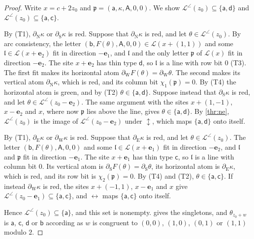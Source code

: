 \begin{proof}
Write $x=c+2z_0$ and $\mathfrak p=(\mathsf a,\kappa,\mathsf A,0,0)$. We show $\mathcal L^{\angle}(z_0)\subseteq\{\mathsf a,\mathsf d\}$ and $\mathcal L^{\angle}(z_0)\subseteq\{\mathsf a,\mathsf c\}$.

By (T1), $\partial_{\mathrm N}\kappa$ or $\partial_{\mathrm S}\kappa$ is red. Suppose that $\partial_{\mathrm N}\kappa$ is red, and let $\theta\in\mathcal L^{\angle}(z_0)$. By arc consistency, the letter $(\mathsf b,F(\theta),\mathsf A,0,0)\in\mathcal L(x+(1,1))$ and some $\mathfrak l\in\mathcal L(x+\mathbf e_2)$ fit in direction $-\mathbf e_1$, and $\mathfrak l$ and the only letter $\mathfrak p$ of $\mathcal L(x)$ fit in direction $-\mathbf e_2$. The site $x+\mathbf e_2$ has thin type $\mathsf d$, so $\mathfrak l$ is a line with row bit $0$ (T3). The first fit makes its horizontal atom $\partial_{\mathrm W}F(\theta)=\partial_{\mathrm W}\theta$. The second makes its vertical atom $\partial_{\mathrm N}\kappa$, which is red, and its column bit $\chi_1(\mathfrak p)=0$. By (T4) the horizontal atom is green, and by (T2) $\theta\in\{\mathsf a,\mathsf d\}$. Suppose instead that $\partial_{\mathrm S}\kappa$ is red, and let $\theta\in\mathcal L^{\angle}(z_0-\mathbf e_2)$. The same argument with the sites $x+(1,-1)$, $x-\mathbf e_2$ and $x$, where now $\mathfrak p$ lies above the line, gives $\theta\in\{\mathsf a,\mathsf d\}$. By \cref{thr:ne}, $\mathcal L^{\angle}(z_0)$ is the image of $\mathcal L^{\angle}(z_0-\mathbf e_2)$ under ${\updownarrow}$, which maps $\{\mathsf a,\mathsf d\}$ onto itself.

By (T1), $\partial_{\mathrm E}\kappa$ or $\partial_{\mathrm W}\kappa$ is red. Suppose that $\partial_{\mathrm E}\kappa$ is red, and let $\theta\in\mathcal L^{\angle}(z_0)$. The letter $(\mathsf b,F(\theta),\mathsf A,0,0)$ and some $\mathfrak l\in\mathcal L(x+\mathbf e_1)$ fit in direction $-\mathbf e_2$, and $\mathfrak l$ and $\mathfrak p$ fit in direction $-\mathbf e_1$. The site $x+\mathbf e_1$ has thin type $\mathsf c$, so $\mathfrak l$ is a line with column bit $0$. Its vertical atom is $\partial_{\mathrm S}F(\theta)=\partial_{\mathrm S}\theta$, its horizontal atom is $\partial_{\mathrm E}\kappa$, which is red, and its row bit is $\chi_2(\mathfrak p)=0$. By (T4) and (T2), $\theta\in\{\mathsf a,\mathsf c\}$. If instead $\partial_{\mathrm W}\kappa$ is red, the sites $x+(-1,1)$, $x-\mathbf e_1$ and $x$ give $\mathcal L^{\angle}(z_0-\mathbf e_1)\subseteq\{\mathsf a,\mathsf c\}$, and ${\leftrightarrow}$ maps $\{\mathsf a,\mathsf c\}$ onto itself.

Hence $\mathcal L^{\angle}(z_0)\subseteq\{\mathsf a\}$, and this set is nonempty.  gives the singletons, and $\theta_{z_0+w}$ is $\mathsf a$, $\mathsf c$, $\mathsf d$ or $\mathsf b$ according as $w$ is congruent to $(0,0)$, $(1,0)$, $(0,1)$ or $(1,1)$ modulo $2$.
\end{proof}

